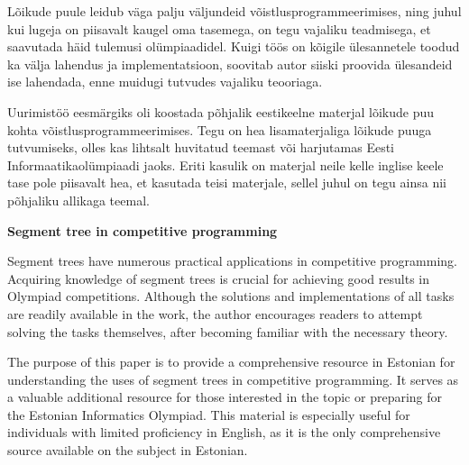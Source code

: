 \documentclass{trkut}
\begin{document}

Lõikude puule leidub väga palju väljundeid võistlusprogrammeerimises, ning juhul kui lugeja on piisavalt kaugel oma tasemega, on tegu vajaliku teadmisega, et saavutada häid tulemusi olümpiaadidel. Kuigi töös on kõigile ülesannetele toodud ka välja lahendus ja implementatsioon, soovitab autor siiski proovida ülesandeid ise lahendada, enne muidugi tutvudes vajaliku teooriaga.

Uurimistöö eesmärgiks oli koostada põhjalik eestikeelne materjal lõikude puu kohta võistlusprogrammeerimises. Tegu on hea lisamaterjaliga lõikude puuga tutvumiseks, olles kas lihtsalt huvitatud teemast või harjutamas Eesti Informaatikaolümpiaadi jaoks. Eriti kasulik on materjal neile kelle inglise keele tase pole piisavalt hea, et kasutada teisi materjale, sellel juhul on tegu ainsa nii põhjaliku allikaga teemal.


\textbf{Segment tree in competitive programming}

Segment trees have numerous practical applications in competitive programming. Acquiring knowledge of segment trees is crucial for achieving good results in Olympiad competitions. Although the solutions and implementations of all tasks are readily available in the work, the author encourages readers to attempt solving the tasks themselves, after becoming familiar with the necessary theory.

The purpose of this paper is to provide a comprehensive resource in Estonian for understanding the uses of segment trees in competitive programming. It serves as a valuable additional resource for those interested in the topic or preparing for the Estonian Informatics Olympiad. This material is especially useful for individuals with limited proficiency in English, as it is the only comprehensive source available on the subject in Estonian.

\kinnitusleht
\end{document}
